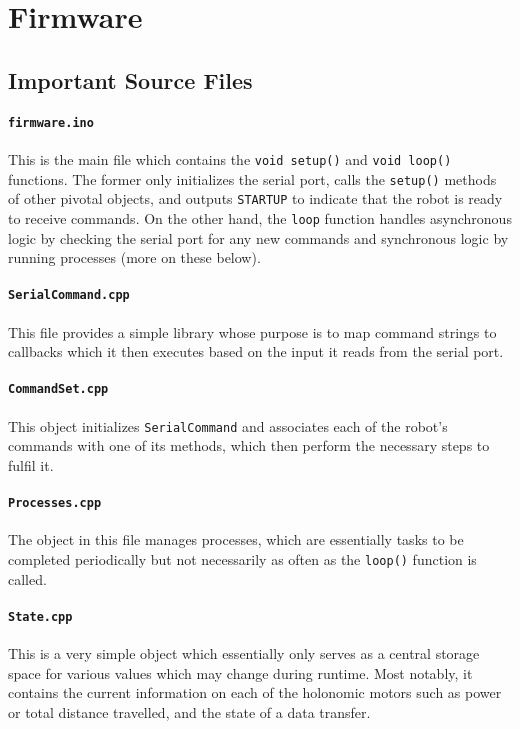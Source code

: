%
%

\section{Firmware}

\subsection{Important Source Files}

\paragraph{\texttt{firmware.ino}}
This is the main file which contains the \texttt{void setup()} and \texttt{void loop()} functions. The former only initializes the serial port, calls the \texttt{setup()} methods of other pivotal objects, and outputs \texttt{STARTUP} to indicate that the robot is ready to receive commands. On the other hand, the \texttt{loop} function handles asynchronous logic by checking the serial port for any new commands and synchronous logic by running processes (more on these below).

\paragraph{\texttt{SerialCommand.cpp}} This file provides a simple library whose purpose is to map command strings to callbacks which it then executes based on the input it reads from the serial port.

\paragraph{\texttt{CommandSet.cpp}} This object initializes \texttt{SerialCommand} and associates each of the robot's commands with one of its methods, which then perform the necessary steps to fulfil it.

\paragraph{\texttt{Processes.cpp}} The object in this file manages processes, which are essentially tasks to be completed periodically but not necessarily as often as the \texttt{loop()} function is called. 

\paragraph{\texttt{State.cpp}} This is a very simple object which essentially only serves as a central storage space for various values which may change during runtime. Most notably, it contains the current information on each of the holonomic motors such as power or total distance travelled, and the state of a data transfer.

